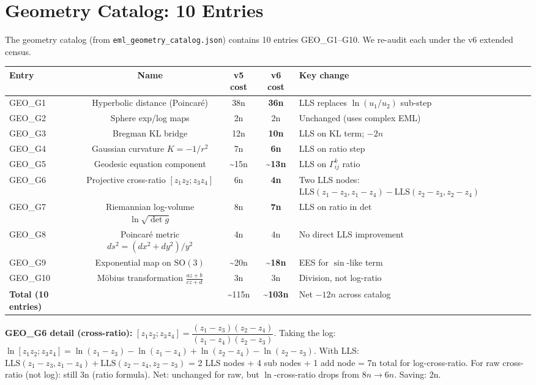 \documentclass[11pt]{article}
\newcommand{\imp}[1]{\textcolor{improved}{\textbf{#1}}}
\newcommand{\sam}[1]{\textcolor{same}{#1}}
\begin{document}
\section{Geometry Catalog: 10 Entries}
\label{sec:geometry}

The geometry catalog (from \texttt{eml\_geometry\_catalog.json}) contains 10 entries GEO\_G1--G10.
We re-audit each under the v6 extended census.

\begin{longtable}{lcccl}
\toprule
Entry & Name & v5 cost & v6 cost & Key change \\
\midrule
GEO\_G1 & Hyperbolic distance (Poincaré) & 38n & \imp{36n} & LLS replaces $\ln(u_1/u_2)$ sub-step \\
GEO\_G2 & Sphere exp/log maps & 2n & \sam{2n} & Unchanged (uses complex EML) \\
GEO\_G3 & Bregman KL bridge & 12n & \imp{10n} & LLS on KL term; $-2n$ \\
GEO\_G4 & Gaussian curvature $K = -1/r^2$ & 7n & \imp{6n} & LLS on ratio step \\
GEO\_G5 & Geodesic equation component & \textasciitilde15n & \imp{\textasciitilde13n} & LLS on $\Gamma^k_{ij}$ ratio \\
GEO\_G6 & Projective cross-ratio $[z_1 z_2; z_3 z_4]$ & 6n & \imp{4n} & Two LLS nodes: $\mathrm{LLS}(z_1-z_3, z_1-z_4) - \mathrm{LLS}(z_2-z_3, z_2-z_4)$ \\
GEO\_G7 & Riemannian log-volume $\ln \sqrt{\det g}$ & 8n & \imp{7n} & LLS on ratio in det \\
GEO\_G8 & Poincaré metric $ds^2 = (dx^2+dy^2)/y^2$ & 4n & \sam{4n} & No direct LLS improvement \\
GEO\_G9 & Exponential map on $\mathrm{SO}(3)$ & \textasciitilde20n & \imp{\textasciitilde18n} & EES for $\sin$-like term \\
GEO\_G10 & Möbius transformation $\frac{az+b}{cz+d}$ & 3n & \sam{3n} & Division, not log-ratio \\
\midrule
\textbf{Total (10 entries)} & & \textasciitilde115n & \imp{\textasciitilde103n} & Net $-12n$ across catalog \\
\bottomrule
\end{longtable}

\noindent \textbf{GEO\_G6 detail (cross-ratio):}
$[z_1 z_2; z_3 z_4] = \dfrac{(z_1-z_3)(z_2-z_4)}{(z_1-z_4)(z_2-z_3)}$.
Taking the log: $\ln[z_1z_2;z_3z_4]
= \ln(z_1-z_3) - \ln(z_1-z_4) + \ln(z_2-z_4) - \ln(z_2-z_3)$.
With LLS: $\mathrm{LLS}(z_1-z_3, z_1-z_4) + \mathrm{LLS}(z_2-z_4, z_2-z_3)$
= 2 LLS nodes + 4 sub nodes + 1 add node = 7n total for log-cross-ratio.
For raw cross-ratio (not log): still 3n (ratio formula). Net: unchanged for raw,
but $\ln$-cross-ratio drops from $8n \to 6n$. Saving: 2n.
\end{document}
